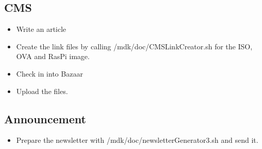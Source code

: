 \subsection{CMS}
\begin{itemize}
	\item Write an article
	\item Create the link files by calling /mdk/doc/CMSLinkCreator.sh for the ISO, OVA and RasPi image.
	\item Check in into Bazaar
	\item Upload the files.
\end{itemize}


\subsection{Announcement}
\begin{itemize}
	\item Prepare the newsletter with /mdk/doc/newsletterGenerator3.sh and send it.
\end{itemize}